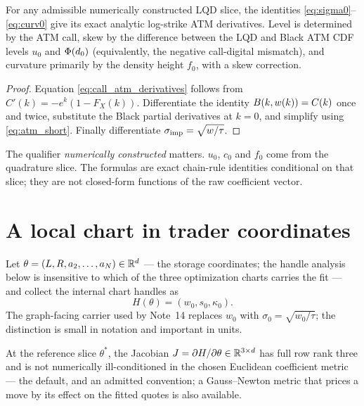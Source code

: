 \documentclass[11pt]{article}
\begin{document}
\begin{proposition}
\label{prop:atm}
For any admissible numerically constructed LQD slice, the identities
\eqref{eq:sigma0}--\eqref{eq:curv0} give its exact analytic log-strike ATM
derivatives.  Level is determined by the ATM call, skew by the difference
between the LQD and Black ATM CDF levels $u_0$ and $\Phi(d_0)$
(equivalently, the negative call-digital mismatch), and curvature primarily by
the density height $f_0$, with a skew correction.
\end{proposition}

\begin{proof}
Equation \eqref{eq:call_atm_derivatives} follows from
$C'(k)=-e^k(1-F_X(k))$.  Differentiate the identity
$B(k,w(k))=C(k)$ once and twice, substitute the Black partial derivatives
at $k=0$, and simplify using \eqref{eq:atm_short}.  Finally differentiate
$\sigma_{\rm imp}=\sqrt{w/\tau}$.
\end{proof}

The qualifier \emph{numerically constructed} matters.  $u_0$, $c_0$ and $f_0$
come from the quadrature slice.  The formulas are exact chain-rule identities
conditional on that slice; they are not closed-form functions of the raw
coefficient vector.

\section{A local chart in trader coordinates}
\label{sec:chart}

Let $\theta=(L,R,a_2,\ldots,a_N)\in\mathbb{R}^d$ --- the storage coordinates; the
handle analysis below is insensitive to which of the three optimization
charts carries the fit --- and collect the internal chart handles as
\begin{equation}
H(\theta)=(w_0,s_0,\kappa_0).
\end{equation}
The graph-facing carrier used by Note~14 replaces $w_0$ with
$\sigma_0=\sqrt{w_0/\tau}$; the distinction is small in notation and important
in units.

\begin{assumption}
\label{ass:rank}
At the reference slice $\theta^*$, the Jacobian
$J=\partial H/\partial\theta\in\mathbb{R}^{3\times d}$ has full row rank three and is
not numerically ill-conditioned in the chosen Euclidean coefficient metric
--- the default, and an admitted convention; a Gauss--Newton metric that
prices a move by its effect on the fitted quotes is also available.
\end{assumption}
\end{document}
